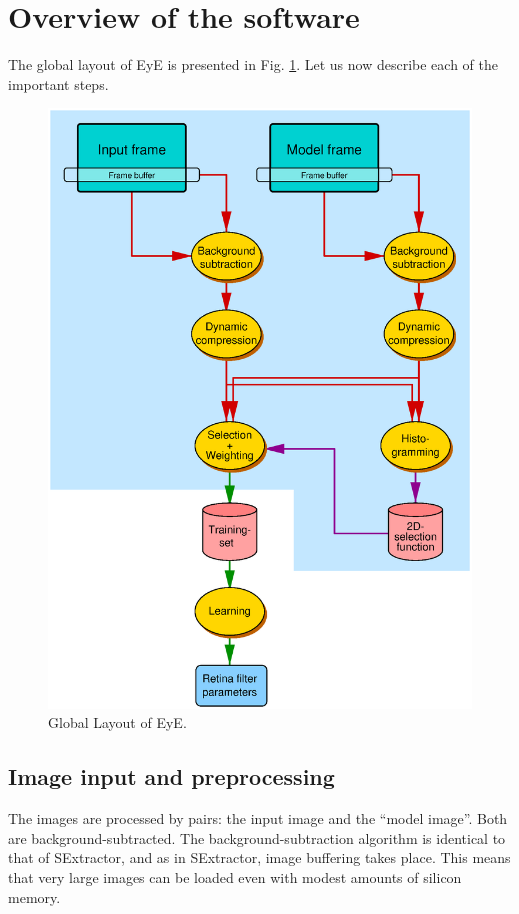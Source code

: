 \documentclass[11pt,titlepage]{article}
\begin{document}
\section{Overview of the software}
\label{techover}
The global layout of {\sc EyE} is presented in Fig. \ref{fig:eyelayout}. Let us now describe each of the important steps.

   \begin{figure}[htbp]
      \centerline{\includegraphics[width=15cm]{ps/eyelayout.ps}}
      \caption{
                Global Layout of {\sc EyE}.
              }
      \label{fig:eyelayout}
   \end{figure}

\subsection{Image input and preprocessing}
The images are processed by pairs: the input image and
the ``model image''. Both are background-subtracted. The background-subtraction algorithm is identical to that of SExtractor, and
as in SExtractor, image buffering takes place. This means that very large images can be loaded even with modest amounts of
silicon memory.
\end{document}
